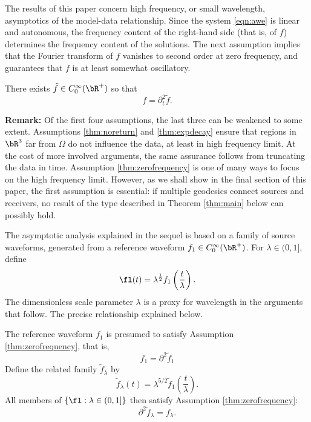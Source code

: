 The results of this paper concern high frequency, or small wavelength,
asymptotics of the model-data relationship. Since the system
\ref{eqn:awe} is linear and autonomous, the frequency content of the
right-hand side (that is, of $f$) determines the frequency content of
the solutions. The next assumption implies that the Fourier transform
of $f$ vanishes to second order at zero frequency, and guarantees that
$f$ is at least somewhat oscillatory.

\begin{assumption}
  \label{thm:zerofrequency}
  There exists $\tilde{f} \in
  C_0^{\infty}(\bR^+)$ so that
  \begin{equation}
    \label{eqn:zerofreq}
    f = \partial_t^2 \tilde{f}.
  \end{equation}
\end{assumption}

{\bf Remark:} Of the first four assumptions, the last three can be
weakened to some extent. Assumptions \ref{thm:noreturn} and
\ref{thm:expdecay} ensure that regions in $\bR^3$ far from $\Omega$ do
not influence the data, at least in high frequency limit. At the cost
of more involved arguments, the same assurance follows from truncating
the data in time. Assumption \ref{thm:zerofrequency} is one of many
ways to focus on the high frequency limit. However, as we shall show
in the final section of this paper, the first assumption is essential:
if multiple geodesics connect sources and receivers, no result of the
type described in Theorem \ref{thm:main} below can possibly hold.

The asymptotic analysis explained in the sequel is
based on a family of source waveforms, generated from a reference
waveform $f_1 \in C_0^{\infty}(\bR^+)$. For $\lambda \in (0,1]$, define
\begin{equation}
  \label{eqn:wvltfam}
  \fl(t)= \lambda^{\frac{1}{2}}f_1\left(\frac{t}{\lambda}\right).
\end{equation}
The dimensionless scale parameter $\lambda$ is a proxy for
wavelength in the arguments that follow. The precise relationship
explained below.

The reference waveform $f_1$ is presumed to satisfy Assumption
\ref{thm:zerofrequency}, that is, 
\[
  f_1 = \partial^2 \tilde{f}_1
\]
Define the related family $\tilde{f}_{\lambda}$ by
\begin{equation}
  \label{eqn:tildeflam}
  \tilde{f}_{\lambda}(t) =
  \lambda^{5/2}\tilde{f}_1\left(\frac{t}{\lambda}\right).
\end{equation}
All members of $\{\fl: \lambda \in (0,1]\}$ then satisfy Assumption
\ref{thm:zerofrequency}: 
\[
  \partial^2 \tilde{f}_{\lambda} = f_{\lambda}.
\]

